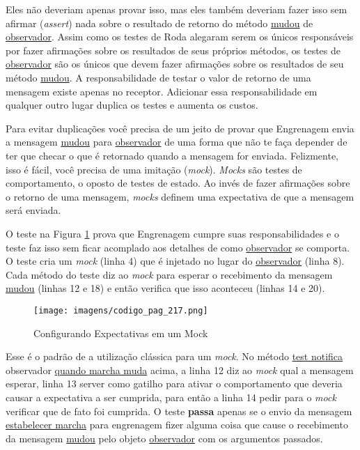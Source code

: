 Eles não deveriam apenas provar isso, mas eles também deveriam fazer isso sem afirmar (\textit{assert}) nada sobre o resultado de retorno do método \underline{mudou} de \underline{observador}. Assim como os testes de Roda alegaram serem os únicos responsáveis por fazer afirmações sobre os resultados de seus próprios métodos, os testes de \underline{observador} são os únicos que devem fazer afirmações sobre os resultados de seu método \underline{mudou}. A responsabilidade de testar o valor de retorno de uma mensagem existe apenas no receptor. Adicionar essa responsabilidade em qualquer outro lugar duplica os testes e aumenta os custos.

Para evitar duplicações você precisa de um jeito de provar que Engrenagem envia a mensagem \underline{mudou} para \underline{observador} de uma forma que não te faça depender de ter que checar o que é retornado quando a mensagem for enviada.  Felizmente, isso é fácil, você precisa de uma imitação (\textit{mock}). \textit{Mocks} são testes de comportamento, o oposto de testes de estado. Ao invés de fazer afirmações sobre o retorno de uma mensagem, \textit{mocks} definem uma expectativa de que a mensagem será enviada.

O teste na Figura \ref{img:codigo_pag_217} prova que Engrenagem cumpre suas responsabilidades e o teste faz isso sem ficar acomplado aos detalhes de como \underline{observador} se comporta. O teste cria um \textit{mock} (linha 4) que é injetado no lugar do \underline{observador} (linha 8). Cada método do teste diz ao \textit{mock} para esperar o recebimento da mensagem \underline{mudou} (linhas 12 e 18) e então verifica que isso aconteceu (linhas 14 e 20).

\begin{figure}[!htbp]
  \center
  \caption{Configurando Expectativas em um Mock}
  \texttt{[image: imagens/codigo\_pag\_217.png]}
  \label{img:codigo_pag_217}
\end{figure}

Esse é o padrão de a utilização clássica para um \textit{mock}. No método \underline{test notifica} observador \underline{quando marcha muda} acima, a linha 12 diz ao \textit{mock} qual a mensagem esperar, linha 13 server como gatilho para ativar o comportamento que deveria causar a expectativa a ser cumprida, para então a linha 14 pedir para o \textit{mock} verificar que de fato foi cumprida. O teste \textbf{passa} apenas se o envio da mensagem \underline{estabelecer marcha} para engrenagem fizer alguma coisa que cause o recebimento da mensagem \underline{mudou} pelo objeto \underline{observador} com os argumentos passados.

